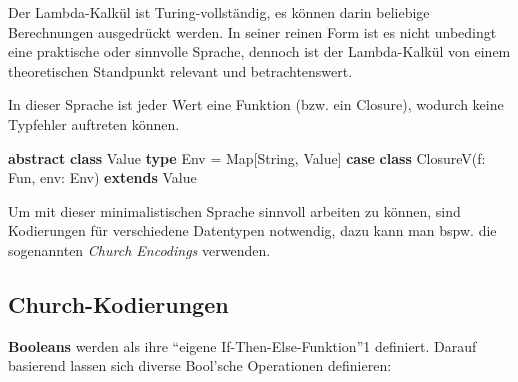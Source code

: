 \documentclass[]{article}
\newenvironment{Shaded}{}{}
\newcommand{\FunctionTok}[1]{\textcolor[rgb]{0.02,0.16,0.49}{#1}}
\newcommand{\KeywordTok}[1]{\textcolor[rgb]{0.00,0.44,0.13}{\textbf{#1}}}
\newcommand{\NormalTok}[1]{#1}
\begin{document}
Der Lambda-Kalkül ist Turing-vollständig, es können darin beliebige
Berechnungen ausgedrückt werden. In seiner reinen Form ist es nicht
unbedingt eine praktische oder sinnvolle Sprache, dennoch ist der
Lambda-Kalkül von einem theoretischen Standpunkt relevant und
betrachtenswert.

In dieser Sprache ist jeder Wert eine Funktion (bzw. ein Closure),
wodurch keine Typfehler auftreten können.

\begin{Shaded}
\begin{Highlighting}[]
\KeywordTok{abstract} \KeywordTok{class}\NormalTok{ Value}
\KeywordTok{type}\NormalTok{ Env = Map[String, Value]}
\KeywordTok{case} \KeywordTok{class} \FunctionTok{ClosureV}\NormalTok{(f: Fun, env: Env) }\KeywordTok{extends}\NormalTok{ Value}
\end{Highlighting}
\end{Shaded}

Um mit dieser minimalistischen Sprache sinnvoll arbeiten zu können, sind
Kodierungen für verschiedene Datentypen notwendig, dazu kann man bspw.
die sogenannten \emph{Church Encodings} verwenden.

\hypertarget{church-kodierungen}{%
\subsection{Church-Kodierungen}\label{church-kodierungen}}

\textbf{Booleans} werden als ihre ``eigene If-Then-Else-Funktion''1
definiert. Darauf basierend lassen sich diverse Bool'sche Operationen
definieren:
\end{document}

